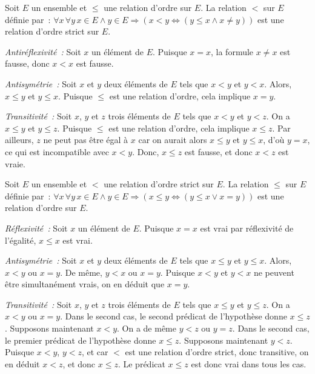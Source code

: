 \blank[medium]

\noindent{} Soit $E$ un ensemble et $\leq$ une relation d'ordre sur $E$. 
    La relation $<$ sur $E$ définie par : $\forall x \, \forall y \, x \in E \wedge y \in E \Rightarrow (x < y \Leftrightarrow (y \leq x \wedge x \neq y))$ est une relation d'ordre strict sur $E$. 

\blank[medium]

\noindent{} 
\startitemize[nowhite]
    \item \emph{Antiréflexivité :} Soit $x$ un élément de $E$. 
        Puisque $x = x$, la formule $x \neq x$ est fausse, donc $x < x$ est fausse.
    \item \emph{Antisymétrie :} Soit $x$ et $y$ deux éléments de $E$ tels que $x < y$ et $y < x$. 
        Alors, $x \leq y$ et $y \leq x$. 
        Puisque $\leq$ est une relation d'ordre, cela implique $x = y$.
    \item \emph{Transitivité :} Soit $x$, $y$ et $z$ trois éléments de $E$ tels que $x < y$ et $y < z$. 
        On a $x \leq y$ et $y \leq z$. 
        Puisque $\leq$ est une relation d'ordre, cela implique $x \leq z$. 
        Par ailleurs, $z$ ne peut pas être égal à $x$ car on aurait alors $x \leq y$ et $y \leq x$, d'où $y = x$, ce qui est incompatible avec $x < y$. 
        Donc, $x \leq z$ est fausse, et donc $x < z$ est vraie.
\stopitemize

\hfill\square

\blank[medium]

\noindent{} Soit $E$ un ensemble et $<$ une relation d'ordre strict sur $E$. 
    La relation $\leq$ sur $E$ définie par : $\forall x \, \forall y \, x \in E \wedge y \in E \Rightarrow (x \leq y \Leftrightarrow (y \leq x \vee x = y))$ est une relation d'ordre sur $E$. 

\blank[medium]

\noindent{} 
\startitemize[nowhite]
    \item \emph{Réflexivité :} Soit $x$ un élément de $E$. 
        Puisque $x = x$ est vrai par réflexivité de l'égalité, $x \leq x$ est vrai.
    \item \emph{Antisymétrie :} Soit $x$ et $y$ deux éléments de $E$ tels que $x \leq y$ et $y \leq x$. 
        Alors, $x < y$ ou $x = y$. 
        De même, $y < x$ ou $x = y$. 
        Puisque $x < y$ et $y < x$ ne peuvent être simultanément vrais, on en déduit que $x = y$.
    \item \emph{Transitivité :} Soit $x$, $y$ et $z$ trois éléments de $E$ tels que $x \leq y$ et $y \leq z$. 
        On a $x < y$ ou $x = y$.
        Dans le second cas, le second prédicat de l'hypothèse donne $x \leq z$.
        Supposons maintenant $x < y$. 
        On a de même $y < z$ ou $y = z$. 
        Dans le second cas, le premier prédicat de l'hypothèse donne $x \leq z$.
        Supposons maintenant $y < z$. 
        Puisque $x < y$, $y < z$, et car $<$ est une relation d'ordre strict, donc transitive, on en déduit $x < z$, et donc $x \leq z$. 
        Le prédicat $x \leq z$ est donc vrai dans tous les cas.
\stopitemize


